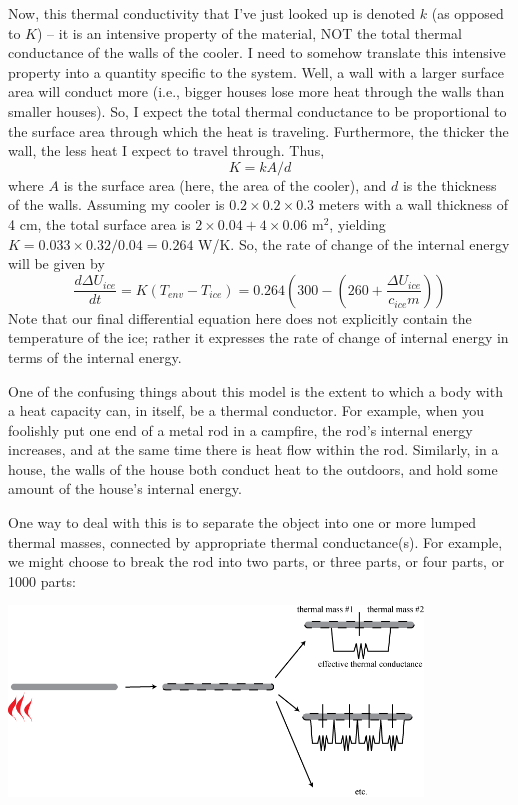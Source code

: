 \documentclass[10pt]{book}
\newcommand{\beforefig}{\vspace{0.2in}}
\newcommand{\afterfig}{\vspace{0.2in}}
\begin{document}
Now, this thermal conductivity that I've just looked up is denoted $k$ (as opposed to $K$) -- it is an intensive property of the material, NOT the total thermal conductance of the walls of the cooler.  I need to somehow translate this intensive property into a quantity specific to the system.  Well, a wall with a larger surface area will conduct more (i.e., bigger houses lose more heat through the walls than smaller houses).  So, I expect the total thermal conductance to be proportional to the surface area through which the heat is traveling.   Furthermore, the thicker the wall, the less heat I expect to travel through.  Thus,
$$K = k A/d$$
where $A$ is the surface area (here, the area of the cooler), and $d$ is the thickness of the walls.  Assuming my cooler is $0.2 \times 0.2 \times 0.3$ meters with a wall thickness of 4 cm,  the total surface area is $2\times 0.04 + 4 \times 0.06$ m$^2$, yielding $K = 0.033 \times 0.32 /0.04 = 0.264$ W/K.
So, the rate of change of the internal energy will be given by
$$\frac{d\Delta U_{ice}}{dt} = K (T_{env}-T_{ice}) = 0.264\left(300 - \left(260+\frac{\Delta U_{ice}}{c_{ice}m} \right) \right)$$
Note that our final differential equation here does not explicitly contain the temperature of the ice; rather it expresses the rate of change of internal energy in terms of the internal energy.

One of the confusing things about this model is the extent to which a body with a heat capacity can, in itself, be a thermal conductor.  For example, when you foolishly put one end of a metal rod in a campfire, the rod's internal energy increases, and at the same time there is heat flow within the rod.   Similarly, in a house, the walls of the house both conduct heat to the outdoors, and hold some amount of the house's internal energy.

One way to deal with this is to separate the object into one or more lumped thermal masses, connected by appropriate thermal conductance(s).  For example, we might choose to break the rod into two parts, or three parts, or four parts, or 1000 parts:

\beforefig
 \centerline{\includegraphics[height=2in]{figs/BreakingUpARod}}
\afterfig
\end{document}
